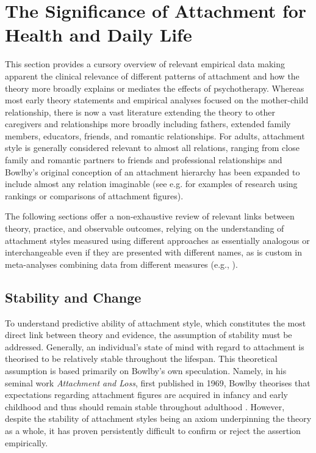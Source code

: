 \documentclass[12pt]{report}
\begin{document}
\chapter{The Significance of Attachment for Health and Daily Life}
\label{sec:theory and review}
This section provides a cursory overview of relevant empirical data making apparent the clinical relevance of different patterns of attachment and how the theory more broadly explains or mediates the effects of psychotherapy.
Whereas most early theory statements and empirical analyses focused on the mother-child relationship, there is now a vast literature extending the theory to other caregivers and relationships more broadly including fathers, extended family members, educators, friends, and romantic relationships.
For adults, attachment style is generally considered relevant to almost all relations, ranging from close family and romantic partners to friends and professional relationships and Bowlby's original conception of an attachment hierarchy \cite{Bowlby1969attachment} has been expanded to include almost any relation imaginable (see e.g.  for examples of research using rankings or comparisons of attachment figures).

The following sections offer a non-exhaustive review of relevant links between theory, practice, and observable outcomes, relying on the understanding of attachment styles measured using different approaches as essentially analogous or interchangeable even if they are presented with different names, as is custom in meta-analyses combining data from different measures (e.g., ).

\section{Stability and Change}
To understand predictive ability of attachment style, which constitutes the most direct link between theory and evidence, the assumption of stability must be addressed. Generally, an individual's state of mind with regard to attachment is theorised to be relatively stable throughout the lifespan. This theoretical assumption is based primarily on Bowlby's own speculation. Namely, in his seminal work \textit{Attachment and Loss}, first published in 1969, Bowlby theorises that expectations regarding attachment figures are acquired in infancy and early childhood and thus should remain stable throughout adulthood \cite{Bowlby1969attachment, Bowlby1973separation,Bowlby1980loss}. However, despite the stability of attachment styles being an axiom underpinning the theory as a whole, it has proven persistently difficult to confirm or reject the assertion empirically.
\end{document}
